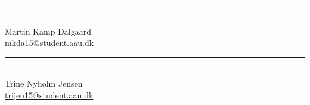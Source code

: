 \vspace{3\baselineskip}
\vspace{1\baselineskip}
\begin{minipage}[b]{0.45\textwidth}
 \centering
 \rule{\textwidth}{0.5pt}\\
Martin Kamp Dalgaard\\
 {\footnotesize \href{mailto:mkda15@student.aau.dk}{mkda15@student.aau.dk}}  
\end{minipage}
\hfill
\begin{minipage}[b]{0.45\textwidth}
 \centering
 \rule{\textwidth}{0.5pt}\\
 Trine Nyholm Jensen\\
 {\footnotesize \href{mailto:trijen15@student.aau.dk}{trijen15@student.aau.dk}}  
\end{minipage}
\vspace{2\baselineskip}
\vspace{1\baselineskip}